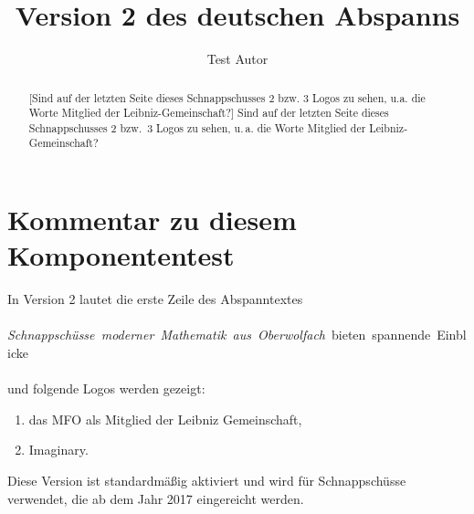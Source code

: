 \documentclass{snapshotmfo}
\author{Test Autor}
\title{Version 2 des deutschen Abspanns}
\begin{document}

\begin{abstract}[Sind auf der letzten Seite dieses Schnappschusses 2 bzw. 3 Logos zu sehen, u.a. die Worte \glqq Mitglied der Leibniz-Gemeinschaft\grqq ?]
Sind auf der letzten Seite dieses Schnappschusses 2 bzw.\ 3 Logos zu sehen, u.\,a. die Worte \glqq Mitglied der Leibniz-Gemeinschaft\grqq ?
\end{abstract}

\section{Kommentar zu diesem Komponententest}
In Version 2 lautet die erste Zeile des Abspanntextes\\
\\
\hbox{\emph{Schnappsch\"usse moderner Mathematik aus Oberwolfach} bieten spannende Einblicke}\\
\\
und folgende Logos werden gezeigt:
\begin{enumerate}
  \item das MFO als Mitglied der Leibniz Gemeinschaft,
  \item Imaginary.
\end{enumerate}
Diese Version ist standardmäßig aktiviert
und wird für Schnappschüsse verwendet, die ab dem Jahr 2017 eingereicht werden.
\end{document}

